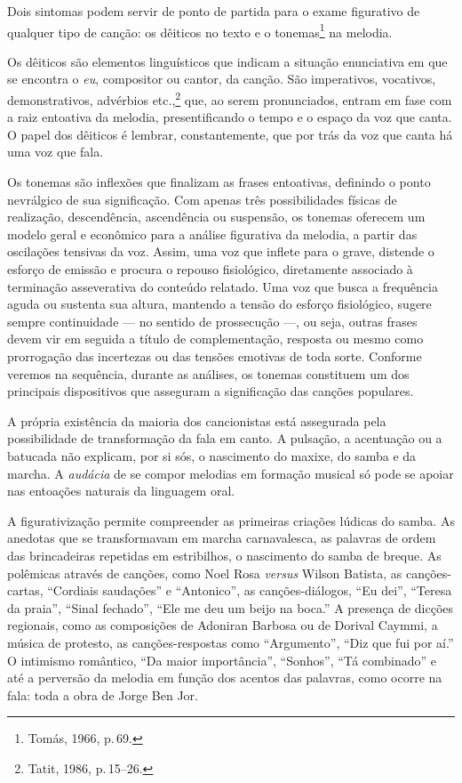 Dois sintomas podem servir de ponto de partida para o exame figurativo
de qualquer tipo de canção: os dêiticos no texto e o tonemas\footnote{Tomás,
1966, p.\,69.} na melodia.

Os dêiticos são elementos linguísticos que indicam a situação
enunciativa em que se encontra o \textit{eu}, compositor ou cantor, da canção.
São imperativos, vocativos, demonstrativos, advérbios etc.,\footnote{Tatit, 1986, p.\,15--26.} que, ao serem pronunciados, entram em fase com a raiz
entoativa da melodia, presentificando o tempo e o espaço da voz que
canta. O papel dos dêiticos é lembrar, constantemente, que por trás da
voz que canta há uma voz que fala.

Os tonemas são inflexões que finalizam as frases entoativas, definindo o
ponto nevrálgico de sua significação. Com apenas três possibilidades
físicas de realização, descendência, ascendência ou suspensão, os
tonemas oferecem um modelo geral e econômico para a análise figurativa
da melodia, a partir das oscilações tensivas da voz. Assim, uma voz que
inflete para o grave, distende o esforço de emissão e procura o repouso
fisiológico, diretamente associado à terminação asseverativa do conteúdo
relatado. Uma voz que busca a frequência aguda ou sustenta sua altura,
mantendo a tensão do esforço fisiológico, sugere sempre continuidade --- no
sentido de prossecução ---, ou seja, outras frases devem vir em seguida a
título de complementação, resposta ou mesmo como prorrogação das
incertezas ou das tensões emotivas de toda sorte. Conforme veremos na
sequência, durante as análises, os tonemas constituem um dos principais
dispositivos que asseguram a significação das canções populares.

A própria existência da maioria dos cancionistas está assegurada pela
possibilidade de transformação da fala em canto. A pulsação, a
acentuação ou a batucada não explicam, por si sós, o nascimento do
maxixe, do samba e da marcha. A \textit{audácia} de se compor melodias em
formação musical só pode se apoiar nas entoações naturais da linguagem
oral.

A figurativização permite compreender as primeiras criações lúdicas do
samba. As anedotas que se transformavam em marcha carnavalesca, as
palavras de ordem das brincadeiras repetidas em estribilhos, o
nascimento do samba de breque. As polêmicas através de canções, como Noel
Rosa \textit{versus} Wilson Batista, as canções-cartas, ``Cordiais saudações'' e
``Antonico'', as canções-diálogos, ``Eu dei'', ``Teresa da praia'', ``Sinal fechado'',
``Ele me deu um beijo na boca.'' A presença de dicções regionais, como as composições de Adoniran Barbosa ou de Dorival Caymmi, a música de
protesto, as canções-respostas como ``Argumento'', ``Diz que fui por aí.'' O
intimismo romântico, ``Da maior importância'', ``Sonhos'', ``Tá combinado'' e até a
perversão da melodia em função dos acentos das palavras, como ocorre na
fala: toda a obra de Jorge Ben Jor.

